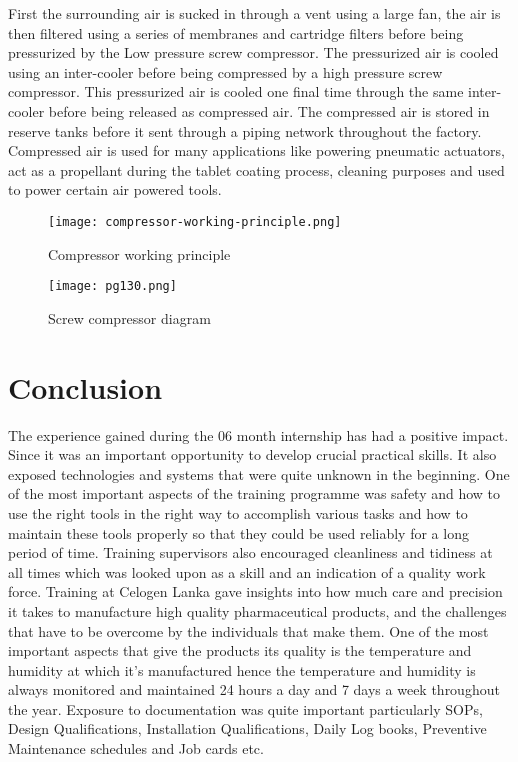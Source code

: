 \documentclass[a4paper,12pt]{article}
\begin{document}
				First the surrounding air is sucked in through a vent using a large fan, the air is then filtered using a series of membranes and cartridge filters before being pressurized by the Low pressure screw compressor.
				The pressurized air is cooled using an inter-cooler before being compressed by a high pressure screw compressor.
				This pressurized air is cooled one final time through the same inter-cooler before being released as compressed air. 
				The compressed air is stored in reserve tanks before it sent through a piping network throughout the factory.
				Compressed air is used for many applications like powering pneumatic actuators, act as a propellant during the tablet coating process, cleaning purposes and used to power certain air powered tools.    
				
				\begin{figure}
					\centering
					\texttt{[image: compressor-working-principle.png]}
					\label{fig:compressor-working-principle}
					\caption{Compressor working principle}
				\end{figure}
				
				\begin{figure}
					\centering
					\texttt{[image: pg130.png]}
					\label{fig:screw-compressor}
					\caption{Screw compressor diagram\citep{trane}}
				\end{figure}
			
			\newpage
			
	\section{Conclusion}
		The experience gained during the 06 month internship has had a positive impact. Since it was an important opportunity to develop crucial practical skills.
		It also exposed technologies and systems that were quite unknown in the beginning. One of the most important aspects of the training programme was safety and how to use the right tools in the right way to accomplish various tasks and how to maintain these tools properly so that they could be used reliably for a long period of time. Training supervisors also encouraged cleanliness and tidiness at all times which was looked upon as a skill and an indication of a quality work force.
		Training at Celogen Lanka gave insights into how much care and precision it takes to manufacture high quality pharmaceutical products, and the challenges that have to be overcome by the individuals that make them.
		One of the most important aspects that give the products its quality is the temperature and humidity at which it's manufactured hence the temperature and humidity is always monitored and maintained 24 hours a day and 7 days a week throughout the year. Exposure to documentation was quite important particularly SOPs, Design Qualifications, Installation Qualifications, Daily Log books, Preventive Maintenance schedules and Job cards etc.  
	


	
\end{document}
